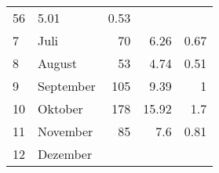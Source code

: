 \begin{longtable}{lXrrr}
       \num{56} &
       \num[round-mode=places,round-precision=2]{5.01} &
         \num[round-mode=places,round-precision=2]{0.53} \\

     7 &
     \multicolumn{1}{X}{ Juli   } &


       \num{70} &
       \num[round-mode=places,round-precision=2]{6.26} &
         \num[round-mode=places,round-precision=2]{0.67} \\

     8 &
     \multicolumn{1}{X}{ August   } &


       \num{53} &
       \num[round-mode=places,round-precision=2]{4.74} &
         \num[round-mode=places,round-precision=2]{0.51} \\

     9 &
     \multicolumn{1}{X}{ September   } &


       \num{105} &
       \num[round-mode=places,round-precision=2]{9.39} &
         \num[round-mode=places,round-precision=2]{1} \\

     10 &
     \multicolumn{1}{X}{ Oktober   } &


       \num{178} &
       \num[round-mode=places,round-precision=2]{15.92} &
         \num[round-mode=places,round-precision=2]{1.7} \\

     11 &
     \multicolumn{1}{X}{ November   } &


       \num{85} &
       \num[round-mode=places,round-precision=2]{7.6} &
         \num[round-mode=places,round-precision=2]{0.81} \\

     12 &
     \multicolumn{1}{X}{ Dezember   } &



\end{longtable}
